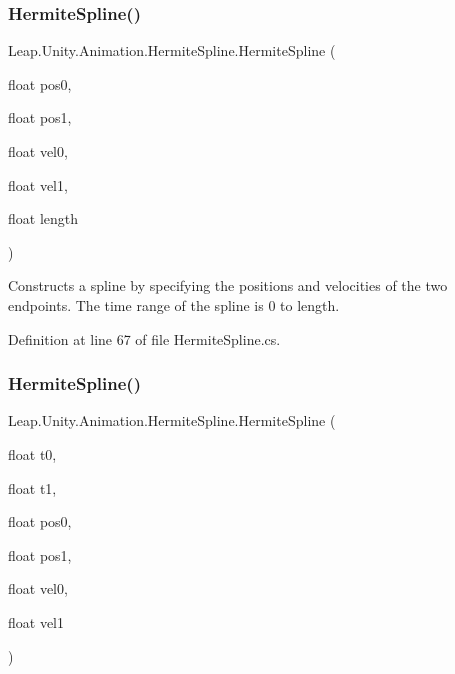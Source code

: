 \mbox{\label{struct_leap_1_1_unity_1_1_animation_1_1_hermite_spline_a9750fb55dca761c774ae4773ff922a85}} 
\subsubsection{\texorpdfstring{HermiteSpline()}{HermiteSpline()}\hspace{0.1cm}{\footnotesize\ttfamily [3/4]}}
{\footnotesize\ttfamily Leap.\+Unity.\+Animation.\+Hermite\+Spline.\+Hermite\+Spline (\begin{DoxyParamCaption}\item[{float}]{pos0,  }\item[{float}]{pos1,  }\item[{float}]{vel0,  }\item[{float}]{vel1,  }\item[{float}]{length }\end{DoxyParamCaption})}



Constructs a spline by specifying the positions and velocities of the two endpoints. The time range of the spline is 0 to length. 



Definition at line 67 of file Hermite\+Spline.\+cs.

\mbox{\label{struct_leap_1_1_unity_1_1_animation_1_1_hermite_spline_a289495b1edbbd687888b5dbcb926b10e}} 
\subsubsection{\texorpdfstring{HermiteSpline()}{HermiteSpline()}\hspace{0.1cm}{\footnotesize\ttfamily [4/4]}}
{\footnotesize\ttfamily Leap.\+Unity.\+Animation.\+Hermite\+Spline.\+Hermite\+Spline (\begin{DoxyParamCaption}\item[{float}]{t0,  }\item[{float}]{t1,  }\item[{float}]{pos0,  }\item[{float}]{pos1,  }\item[{float}]{vel0,  }\item[{float}]{vel1 }\end{DoxyParamCaption})}



